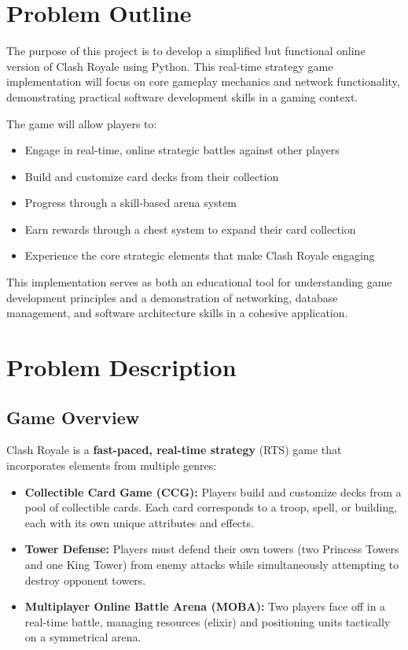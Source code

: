 \documentclass{article}
\begin{document}
\section{Problem Outline}

The purpose of this project is to develop a simplified but functional online version of Clash Royale using Python. This real-time strategy game implementation will focus on core gameplay mechanics and network functionality, demonstrating practical software development skills in a gaming context.

\noindent The game will allow players to:
\begin{itemize}
    \item Engage in real-time, online strategic battles against other players
    \item Build and customize card decks from their collection
    \item Progress through a skill-based arena system
    \item Earn rewards through a chest system to expand their card collection
    \item Experience the core strategic elements that make Clash Royale engaging
\end{itemize}

\noindent This implementation serves as both an educational tool for understanding game development principles and a demonstration of networking, database management, and software architecture skills in a cohesive application.

\section{Problem Description}

\subsection{Game Overview}
Clash Royale is a \textbf{fast-paced, real-time strategy} (RTS) game that incorporates elements from multiple genres:

\begin{itemize}
    \item \textbf{Collectible Card Game (CCG):} Players build and customize decks from a pool of collectible cards. Each card corresponds to a troop, spell, or building, each with its own unique attributes and effects.
    \item \textbf{Tower Defense:} Players must defend their own towers (two Princess Towers and one King Tower) from enemy attacks while simultaneously attempting to destroy opponent towers.
    \item \textbf{Multiplayer Online Battle Arena (MOBA):} Two players face off in a real-time battle, managing resources (elixir) and positioning units tactically on a symmetrical arena.
\end{itemize}
\end{document}
